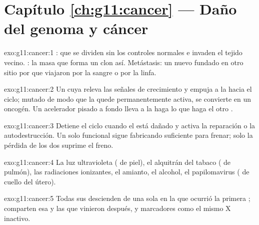 \section*{Capítulo \ref{ch:g11:cancer} --- Daño del genoma y cáncer}

\begin{solution}{exo:g11:cancer:1}
:  que se dividen sin los controles normales e invaden el
tejido vecino. : la masa que forma un clon así. Metástasis: un
 nuevo fundado en otro sitio por  que viajaron por la
sangre o por la linfa.
\end{solution}

\begin{solution}{exo:g11:cancer:2}
Un  cuya  releva las señales de crecimiento y empuja a la
 hacia el ciclo; mutado de modo que la  quede
permanentemente activa, se convierte en un oncogén. Un acelerador
pisado a fondo lleva a la  haga lo que haga el otro .
\end{solution}

\begin{solution}{exo:g11:cancer:3}
Detiene el ciclo cuando el  está dañado y activa la reparación o la
autodestrucción. Un solo  funcional sigue fabricando 
suficiente para frenar; solo la pérdida de los dos suprime el freno.
\end{solution}

\begin{solution}{exo:g11:cancer:4}
La luz ultravioleta ( de piel), el alquitrán del tabaco (
de pulmón), las radiaciones ionizantes, el amianto, el alcohol, el
papilomavirus ( de cuello del útero).
\end{solution}

\begin{solution}{exo:g11:cancer:5}
Todas sus  descienden de una sola en la que ocurrió la primera
; comparten esa  y las que vinieron después, y
marcadores como el mismo  X inactivo.
\end{solution}

